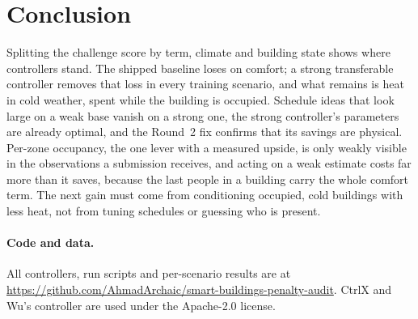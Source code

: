 \documentclass{article}
\begin{document}
\section{Conclusion}
Splitting the challenge score by term, climate and building state shows where controllers stand. The shipped baseline loses on comfort; a strong transferable controller removes that loss in every training scenario, and what remains is heat in cold weather, spent while the building is occupied. Schedule ideas that look large on a weak base vanish on a strong one, the strong controller's parameters are already optimal, and the Round~2 fix confirms that its savings are physical. Per-zone occupancy, the one lever with a measured upside, is only weakly visible in the observations a submission receives, and acting on a weak estimate costs far more than it saves, because the last people in a building carry the whole comfort term. The next gain must come from conditioning occupied, cold buildings with less heat, not from tuning schedules or guessing who is present.

\paragraph{Code and data.} All controllers, run scripts and per-scenario results are at \url{https://github.com/AhmadArchaic/smart-buildings-penalty-audit}. CtrlX and Wu's controller are used under the Apache-2.0 license.
\end{document}
